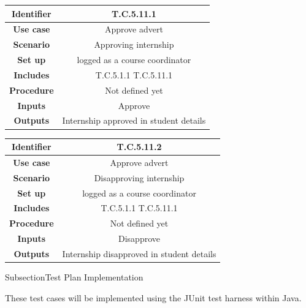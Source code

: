 \documentclass{l3deliverable}
\begin{document}
\begin{tabular}{|c|c|}
\hline \textbf{Identifier} & T.C.5.11.1\\
\hline \textbf{Use case} & Approve advert\\
\hline \textbf{Scenario} & Approving internship\\
\hline \textbf{Set up} & logged as a course coordinator\\
\hline \textbf{Includes} & T.C.5.1.1 T.C.5.11.1\\
\hline \textbf{Procedure} & Not defined yet\\
\hline \textbf{Inputs} & Approve\\
\hline \textbf{Outputs} & Internship approved in student details\\
\hline
\end{tabular}

\begin{tabular}{|c|c|}
\hline \textbf{Identifier} & T.C.5.11.2\\
\hline \textbf{Use case} & Approve advert\\
\hline \textbf{Scenario} & Disapproving internship\\
\hline \textbf{Set up} & logged as a course coordinator\\
\hline \textbf{Includes} & T.C.5.1.1 T.C.5.11.1\\
\hline \textbf{Procedure} & Not defined yet\\
\hline \textbf{Inputs} & Disapprove\\
\hline \textbf{Outputs} & Internship disapproved in student details\\
\hline
\end{tabular}

Subsection{Test Plan Implementation}

These test cases will be implemented using the JUnit test harness within Java. 
\end{document}
